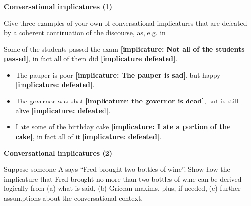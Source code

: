 \documentclass[11pt]{article}
\begin{document}
\vspace*{0.5cm} %
\newpage

\begin{problem}{2}
\textbf{Conversational implicatures (1)}

Give three examples of your own of conversational implicatures that are defeated by a coherent continuation of the discourse, as, e.g. in 

Some of the students passed the exam \textbf{[implicature: Not all of the students passed]}, in fact all of them did \textbf{[implicature defeated]}.


\end{problem}

\begin{solution}
\begin{itemize}

    \item The pauper is poor \textbf{[implicature: The pauper is sad]}, but happy \textbf{[implicature: defeated]}.

    \item The governor was shot \textbf{[implicature: the governor is dead]}, but is still alive \textbf{[implicature: defeated]}.

    \item I ate some of the birthday cake \textbf{[implicature: I ate a portion of the cake]}, in fact all of it \textbf{[implicature: defeated]}.
\end{itemize}

\end{solution}

\vspace*{0.5cm}
\newpage

\begin{problem}{3}
\textbf{ Conversational implicatures (2)}

Suppose someone A says ``Fred brought two bottles of wine''. Show how the
implicature that Fred brought no more than two bottles of wine can be derived
logically from (a) what is said, (b) Gricean maxims, plus, if needed, (c) further
assumptions about the conversational context.
\end{problem}
\end{document}
